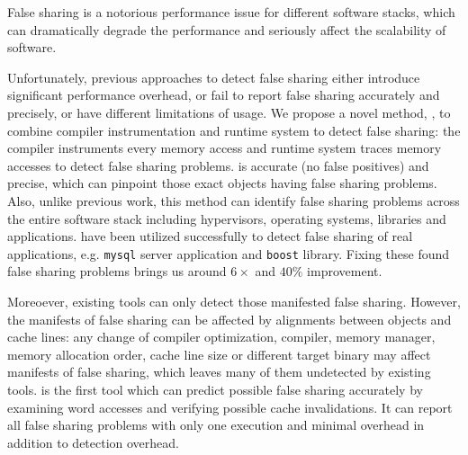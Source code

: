 
\begin{comment}
False sharing is notorious for performance degradation in multithreaded
programs. It apprears when two or more threads running on different cores periodically access 
different portions of data that can fit into one cache line. Since caching
system in a multicore processor needs to ensure a coherent view of memory
accross all cores, it has to grant an exclusive access
for each write operation by invidating duplicate copies in other cores. As a
result, frequent cache invalidation can seriously affect the scalability and
performance of multithreaded programs.
\end{comment} 

False sharing is a notorious performance issue for different software stacks, 
which can dramatically degrade the performance and seriously affect the scalability 
of software.

Unfortunately, previous approaches to detect false sharing
either introduce significant performance overhead, or fail
to report false sharing accurately and precisely, or have different limitations of usage. 
We propose a novel method, , to combine compiler instrumentation
and runtime system to detect false sharing: 
the compiler instruments every memory access and 
runtime system traces memory accesses to detect false sharing problems.
 is accurate (no false positives) and precise, which can pinpoint 
those exact objects having false sharing problems.
Also, unlike previous work, this method can
identify false sharing problems across the entire software stack including 
hypervisors, operating systems, libraries and applications. 
 have been utilized successfully to detect false sharing of real applications,
e.g. \texttt{mysql} server application and \texttt{boost} library. Fixing these found
false sharing problems brings us around $6\times$ and $40\%$ improvement.

Moreoever, existing tools can only detect those manifested false sharing.
However, the manifests of false sharing can be affected by alignments between
objects and cache lines: any change of compiler optimization, compiler, memory manager, 
memory allocation order, cache line size or different target binary 
may affect manifests of false sharing, 
which leaves many of them undetected by existing tools.
\Defaults{} is the first tool which can predict possible false sharing 
accurately by examining word accesses and verifying possible cache invalidations.   
It can report all false sharing problems with only one execution and 
minimal overhead in addition to detection overhead. 

